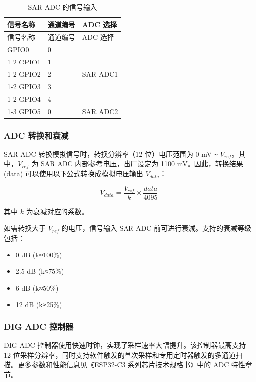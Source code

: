 \documentclass[main\_\_CN.tex]{subfiles}
\begin{document}
\begin{longtable}{ |p{3cm}|p{1.5cm}|p{2cm}| }
    \caption{SAR ADC 的信号输入}
    \label{tab:sensor-sar-adc-input-signals}
    \\\hline
    \rowcolor{lightgray}
    信号名称 & 通道编号  & ADC 选择 \\\hline
    \endfirsthead
    \hline
    \rowcolor{lightgray}   
    信号名称 & 通道编号  & ADC 选择 \\\hline
    \endhead
    \hline
    \endfoot
    GPIO0       &  0  & \multirow{5}{*}{SAR ADC1} \\ \cline{1-2}
    GPIO1       &  1  & \\ \cline{1-2}
    GPIO2       &  2  & \\ \cline{1-2}
    GPIO3       &  3  & \\ \cline{1-2}
    GPIO4       &  4  & \\ \cline{1-3}
    GPIO5       &  0  & SAR ADC2 \\ \hline
\end{longtable}

\subsubsection{ADC 转换和衰减}

SAR ADC 转换模拟信号时，转换分辨率（12 位）电压范围为 0 mV \verb+~+ \(V_{ref}\)。其中，\(V_{ref}\) 为 SAR ADC 内部参考电压，出厂设定为 1100 mV。因此，转换结果 (data) 可以使用以下公式转换成模拟电压输出 \(V_{data}\)：

    \[
    V_{data} = \frac{V_{ref}}{k}\times{\frac{data}{4095}}
    \]

其中 \(k\) 为衰减对应的系数。

如需转换大于 \(V_{ref}\) 的电压，信号输入 SAR ADC 前可进行衰减。支持的衰减等级包括：

\begin{itemize}
    \item 0 dB (k≈100\%)
    \item 2.5 dB (k≈75\%)
    \item 6 dB (k≈50\%)
    \item 12 dB (k≈25\%)
\end{itemize}

\subsubsection{DIG ADC 控制器}


DIG ADC 控制器使用快速时钟，实现了采样速率大幅提升。该控制器最高支持 12 位采样分辨率，同时支持软件触发的单次采样和专用定时器触发的多通道扫描。更多参数和性能信息见\href{https://www.espressif.com/sites/default/files/documentation/esp32-c3_datasheet_en.pdf}{《ESP32-C3 系列芯片技术规格书》}中的 ADC 特性章节。
\end{document}
